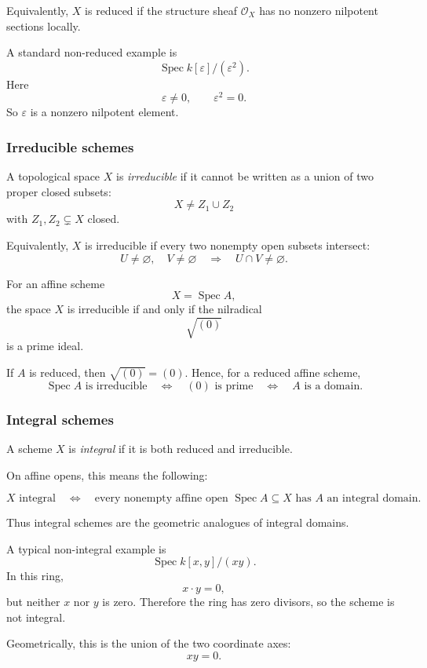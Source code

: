 \documentclass[12pt,a4paper]{article}
\theoremstyle{notespace}
\begin{document}
Equivalently, \(X\) is reduced if the structure sheaf \(\mathcal{O}_X\) has no nonzero nilpotent sections locally.

A standard non-reduced example is
\[
\operatorname{Spec} k[\varepsilon]/(\varepsilon^2).
\]
Here
\[
\varepsilon\neq 0,
\qquad
\varepsilon^2=0.
\]
So \(\varepsilon\) is a nonzero nilpotent element.

\subsubsection*{Irreducible schemes}

A topological space \(X\) is \emph{irreducible} if it cannot be written as a union of two proper closed subsets:
\[
X\neq Z_1\cup Z_2
\]
with \(Z_1,Z_2\subsetneq X\) closed.

Equivalently, \(X\) is irreducible if every two nonempty open subsets intersect:
\[
U\neq\varnothing,\quad V\neq\varnothing
\quad\Longrightarrow\quad
U\cap V\neq\varnothing.
\]

For an affine scheme
\[
X=\operatorname{Spec}A,
\]
the space \(X\) is irreducible if and only if the nilradical
\[
\sqrt{(0)}
\]
is a prime ideal.

If \(A\) is reduced, then \(\sqrt{(0)}=(0)\). Hence, for a reduced affine scheme,
\[
\operatorname{Spec}A \text{ is irreducible}
\quad\Longleftrightarrow\quad
(0) \text{ is prime}
\quad\Longleftrightarrow\quad
A \text{ is a domain}.
\]

\subsubsection*{Integral schemes}

A scheme \(X\) is \emph{integral} if it is both reduced and irreducible.

On affine opens, this means the following:

\[
X \text{ integral}
\quad\Longleftrightarrow\quad
\text{every nonempty affine open } \operatorname{Spec}A\subseteq X
\text{ has } A \text{ an integral domain.}
\]

Thus integral schemes are the geometric analogues of integral domains.

A typical non-integral example is
\[
\operatorname{Spec} k[x,y]/(xy).
\]
In this ring,
\[
x\cdot y=0,
\]
but neither \(x\) nor \(y\) is zero. Therefore the ring has zero divisors, so the scheme is not integral.

Geometrically, this is the union of the two coordinate axes:
\[
xy=0.
\]
\end{document}
